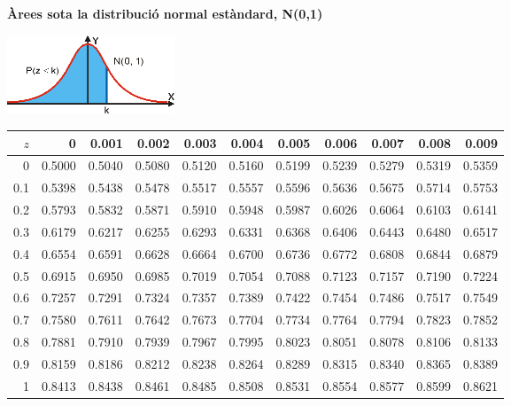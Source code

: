 \begin{table}[t]
	\label{tab:normal01}
	\begin{center}
		\Large	\textbf{Àrees sota la distribució normal estàndard, N(0,1)}
		
		\includegraphics[width=5cm]{img-12/normal01}
	\end{center}
	\vspace{0.25cm}
	
	\centering
	\begin{tabular}{r|rrrrr|rrrrr}
		\hline
		$z$ & 0 & 0.001 & 0.002 & 0.003 & 0.004 & 0.005 & 0.006 & 0.007 & 0.008 & 0.009 \\ 
		\hline
		\rowcolor{lightgray} 0 & 0.5000 & 0.5040 & 0.5080 & 0.5120 & 0.5160 & 0.5199 & 0.5239 & 0.5279 & 0.5319 & 0.5359 \\ 
		0.1 & 0.5398 & 0.5438 & 0.5478 & 0.5517 & 0.5557 & 0.5596 & 0.5636 & 0.5675 & 0.5714 & 0.5753 \\ 
		\rowcolor{lightgray}0.2 & 0.5793 & 0.5832 & 0.5871 & 0.5910 & 0.5948 & 0.5987 & 0.6026 & 0.6064 & 0.6103 & 0.6141 \\ 
		0.3 & 0.6179 & 0.6217 & 0.6255 & 0.6293 & 0.6331 & 0.6368 & 0.6406 & 0.6443 & 0.6480 & 0.6517 \\ 
		\rowcolor{lightgray}0.4 & 0.6554 & 0.6591 & 0.6628 & 0.6664 & 0.6700 & 0.6736 & 0.6772 & 0.6808 & 0.6844 & 0.6879 \\ 
		0.5 & 0.6915 & 0.6950 & 0.6985 & 0.7019 & 0.7054 & 0.7088 & 0.7123 & 0.7157 & 0.7190 & 0.7224 \\ 
		\rowcolor{lightgray}0.6 & 0.7257 & 0.7291 & 0.7324 & 0.7357 & 0.7389 & 0.7422 & 0.7454 & 0.7486 & 0.7517 & 0.7549 \\ 
		0.7 & 0.7580 & 0.7611 & 0.7642 & 0.7673 & 0.7704 & 0.7734 & 0.7764 & 0.7794 & 0.7823 & 0.7852 \\ 
		\rowcolor{lightgray}0.8 & 0.7881 & 0.7910 & 0.7939 & 0.7967 & 0.7995 & 0.8023 & 0.8051 & 0.8078 & 0.8106 & 0.8133 \\ 
		0.9 & 0.8159 & 0.8186 & 0.8212 & 0.8238 & 0.8264 & 0.8289 & 0.8315 & 0.8340 & 0.8365 & 0.8389 \\ 
		\rowcolor{lightgray}1 & 0.8413 & 0.8438 & 0.8461 & 0.8485 & 0.8508 & 0.8531 & 0.8554 & 0.8577 & 0.8599 & 0.8621 \\ 

\end{tabular}
\end{table}
